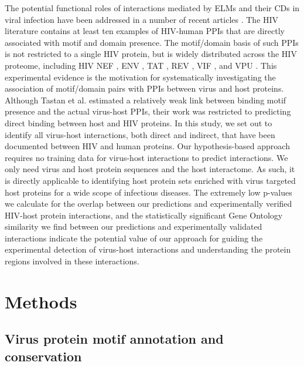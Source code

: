 The potential functional roles of interactions mediated by ELMs and
their CDs in viral infection have been addressed in a number of recent
articles \cite{tonikian08,shelton08,kadaveru08}. The HIV literature
contains at least ten examples of HIV-human PPIs that are directly
associated with motif and domain presence. The motif/domain basis of
such PPIs is not restricted to a single HIV protein, but is widely
distributed across the HIV proteome, including HIV NEF \cite{roeth06},
ENV \cite{byland07}, TAT \cite{truant99}, REV \cite{truant99}, VIF
\cite{mehle06}, and VPU \cite{evrard06}. This experimental evidence is
the motivation for systematically investigating the association of
motif/domain pairs with PPIs between virus and host proteins. Although
Tastan et al. \cite{tastan09} estimated a relatively weak link between
binding motif presence and the actual virus-host PPIs, their work was
restricted to predicting direct binding between host and HIV
proteins. In this study, we set out to identify all virus-host
interactions, both direct and indirect, that have been documented
between HIV and human proteins. Our hypothesis-based approach requires
no training data for virus-host interactions to predict
interactions. We only need virus and host protein sequences and the
host interactome. As such, it is directly applicable to identifying
host protein sets enriched with virus targeted host proteins for a
wide scope of infectious diseases. The extremely low p-values we
calculate for the overlap between our predictions and experimentally
verified HIV-host protein interactions, and the statistically
significant Gene Ontology similarity we find between our predictions
and experimentally validated interactions indicate the potential value
of our approach for guiding the experimental detection of virus-host
interactions and understanding the protein regions involved in these
interactions.

\section{Methods}

\subsection{Virus protein motif annotation and conservation}

